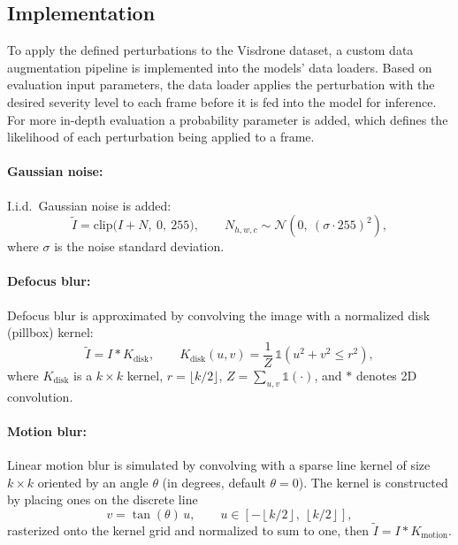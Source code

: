 \documentclass[final,twoside]{vutinfth}
\begin{document}
\subsection{Implementation}
To apply the defined perturbations to the Visdrone dataset, a custom data augmentation pipeline is implemented into the models' data loaders.
Based on evaluation input parameters, the data loader applies the perturbation with the desired severity level to each frame before it is fed into the model for inference.
For more in-depth evaluation a probability parameter is added, which defines the likelihood of each perturbation being applied to a frame.

\paragraph{Gaussian noise:}
I.i.d.\ Gaussian noise is added:
\begin{equation}
\tilde{I} = \mathrm{clip}\big(I + N,\ 0,\ 255\big), \qquad
N_{h,w,c} \sim \mathcal{N}\!\left(0,\ {(\sigma \cdot 255)}^2\right),
\end{equation}
where $\sigma$ is the noise standard deviation.

\paragraph{Defocus blur:}
Defocus blur is approximated by convolving the image with a normalized disk (pillbox) kernel:
\begin{equation}
\tilde{I} = I * K_{\mathrm{disk}}, \qquad
K_{\mathrm{disk}}(u,v)=\frac{1}{Z}\,\mathbb{1}\!\left(u^2+v^2 \le r^2\right),
\end{equation}
where $K_{\mathrm{disk}}$ is a $k\times k$ kernel, $r=\lfloor k/2 \rfloor$, $Z=\sum_{u,v} \mathbb{1}(\cdot)$, and $*$ denotes 2D convolution.

\paragraph{Motion blur:}
Linear motion blur is simulated by convolving with a sparse line kernel of size $k\times k$ oriented by an angle $\theta$ (in degrees, default $\theta=0$). The kernel is constructed by placing ones on the discrete line
\begin{equation}
v = \tan(\theta)\,u, \qquad u \in \left[-\left\lfloor k/2\right\rfloor,\ \left\lfloor k/2\right\rfloor\right],
\end{equation}
rasterized onto the kernel grid and normalized to sum to one, then $\tilde{I} = I * K_{\mathrm{motion}}$.
\end{document}
